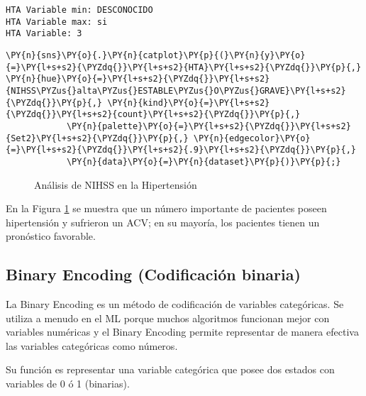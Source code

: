     \begin{Verbatim}[commandchars=\\\{\}]
HTA Variable min: DESCONOCIDO
HTA Variable max: si
HTA Variable: 3
    \end{Verbatim}

    \begin{tcolorbox}[breakable, size=fbox, boxrule=1pt, pad at break*=1mm,colback=cellbackground, colframe=cellborder]
\begin{Verbatim}[commandchars=\\\{\}]
\PY{n}{sns}\PY{o}{.}\PY{n}{catplot}\PY{p}{(}\PY{n}{y}\PY{o}{=}\PY{l+s+s2}{\PYZdq{}}\PY{l+s+s2}{HTA}\PY{l+s+s2}{\PYZdq{}}\PY{p}{,} \PY{n}{hue}\PY{o}{=}\PY{l+s+s2}{\PYZdq{}}\PY{l+s+s2}{NIHSS\PYZus{}alta\PYZus{}ESTABLE\PYZus{}O\PYZus{}GRAVE}\PY{l+s+s2}{\PYZdq{}}\PY{p}{,} \PY{n}{kind}\PY{o}{=}\PY{l+s+s2}{\PYZdq{}}\PY{l+s+s2}{count}\PY{l+s+s2}{\PYZdq{}}\PY{p}{,}
            \PY{n}{palette}\PY{o}{=}\PY{l+s+s2}{\PYZdq{}}\PY{l+s+s2}{Set2}\PY{l+s+s2}{\PYZdq{}}\PY{p}{,} \PY{n}{edgecolor}\PY{o}{=}\PY{l+s+s2}{\PYZdq{}}\PY{l+s+s2}{.9}\PY{l+s+s2}{\PYZdq{}}\PY{p}{,}
            \PY{n}{data}\PY{o}{=}\PY{n}{dataset}\PY{p}{)}\PY{p}{;}
\end{Verbatim}
\end{tcolorbox}

\begin{center}
    	\begin{figure}[H]
	\centering
	\caption{Análisis de NIHSS en la Hipertensión}
	\label{fig:aNISSHiper}
	\end{figure}
\end{center}
    
    En la Figura \ref{fig:aNISSHiper} se muestra que un número importante de pacientes poseen hipertensión y sufrieron un ACV; en su mayoría, los pacientes tienen un pronóstico favorable.

    \hypertarget{binary-encoding-codificaciuxf3n-binaria}{%
\subsection{Binary Encoding (Codificación binaria)}\label{binary-encoding-codificaciuxf3n-binaria}}

	La Binary Encoding es un método de codificación de variables categóricas.  Se utiliza a menudo en el ML porque muchos algoritmos funcionan mejor con variables numéricas y el Binary Encoding permite representar de manera efectiva las variables categóricas como números. 
\par Su función es representar una variable categórica que posee dos estados con variables de 0 ó 1 (binarias)\cite{Hancock2020}.


